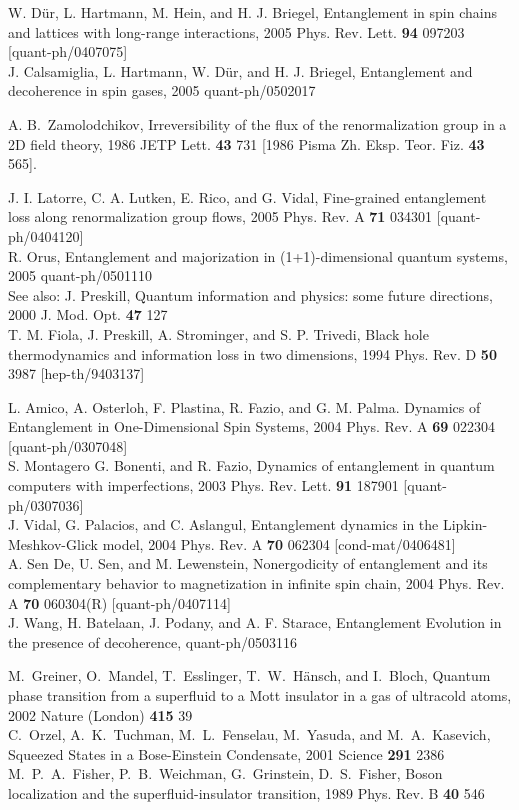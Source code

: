 {\begin{thebibliography}{99}
W. D\"ur, L. Hartmann, M. Hein, and H. J. Briegel,
Entanglement in spin chains and lattices with long-range interactions,
2005 Phys. Rev. Lett. {\bf 94} 097203 [quant-ph/0407075]\\
J. Calsamiglia, L. Hartmann, W. D\"ur, and H. J. Briegel,
Entanglement and decoherence in spin gases,
2005 quant-ph/0502017

%
 A. B.~Zamolodchikov, 
Irreversibility of the flux of the renormalization group in a 2D field theory,
1986 JETP Lett. {\bf 43} 731 [1986  Pisma Zh. Eksp. Teor. Fiz. {\bf 43} 565].
%


J. I. Latorre, C. A. Lutken, E. Rico, and G. Vidal,
Fine-grained entanglement loss along renormalization group flows,
2005 Phys. Rev. A {\bf 71} 034301 [quant-ph/0404120]\\
R. Orus, Entanglement and majorization in (1+1)-dimensional quantum systems,
2005  quant-ph/0501110 \\
See also:  J. Preskill, 
Quantum information and physics: some future directions,
2000 J. Mod. Opt. {\bf 47} 127 \\
T. M. Fiola, J. Preskill, A. Strominger, and S. P. Trivedi,
Black hole thermodynamics and information loss in two dimensions,
1994 Phys. Rev. D {\bf 50} 3987 [hep-th/9403137]
%


L. Amico, A. Osterloh, F. Plastina, R. Fazio, and G. M. Palma.
Dynamics of Entanglement in One-Dimensional Spin Systems,
2004 Phys. Rev. A {\bf 69} 022304 [quant-ph/0307048]\\
S. Montagero G. Bonenti, and R. Fazio,
Dynamics of entanglement in quantum computers with imperfections,
2003 Phys. Rev. Lett. {\bf 91} 187901 [quant-ph/0307036] \\
J. Vidal, G. Palacios, and C. Aslangul, 
Entanglement dynamics in the Lipkin-Meshkov-Glick model,
2004  Phys. Rev. A {\bf 70} 062304 [cond-mat/0406481]\\
A. Sen De, U. Sen, and M. Lewenstein,
Nonergodicity of entanglement and its complementary behavior to 
magnetization in infinite spin chain, 
2004 Phys. Rev. A {\bf 70} 060304(R) [quant-ph/0407114]\\
J. Wang, H. Batelaan, J. Podany, and A. F. Starace,
Entanglement Evolution in the presence of decoherence,
quant-ph/0503116


M.~Greiner, O.~Mandel, T.~Esslinger, T.~W.~H\"ansch, and I.~Bloch,
Quantum phase transition from a superfluid to a Mott insulator 
in a gas of ultracold atoms, 2002 Nature (London) {\bf 415} 39\\
C.~Orzel, A.~K.~Tuchman, M.~L.~Fenselau, M.~Yasuda, and
M.~A.~Kasevich, Squeezed States in a Bose-Einstein Condensate,
2001 Science {\bf 291} 2386\\
M.~P.~A.~Fisher, P.~B.~Weichman, G.~Grinstein, D.~S.~Fisher,
Boson localization and the superfluid-insulator transition,
1989 Phys. Rev. B {\bf 40} 546


\end{thebibliography}}
